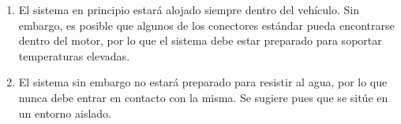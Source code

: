 \begin{enumerate}[resume, label=\textbf{\texttt{RNF-\arabic*}}]
  \item\label{nf:vehicle-env} El sistema en principio estará alojado siempre dentro
  del vehículo. Sin embargo, es posible que algunos de los conectores estándar
  pueda encontrarse dentro del motor, por lo que el sistema debe estar preparado para
  soportar temperaturas elevadas.
  \item\label{nf:water} El sistema sin embargo no estará preparado para resistir al
  agua, por lo que nunca debe entrar en contacto con la misma. Se sugiere pues que
  se sitúe en un entorno aislado.
\end{enumerate}
